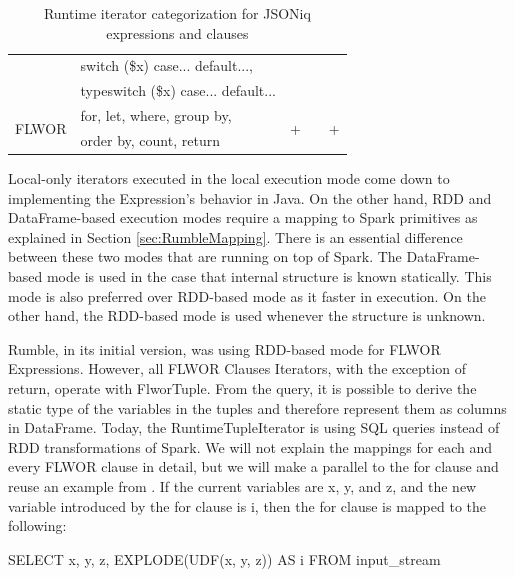 \begin{table}[h!]
{\begin{tabular}{|l|l|l|l|l|}
		\cline{2-2}
		& switch (\$x) case... default...,                           &                    &                    &                     \\ 
		\cline{2-2}
		& typeswitch (\$x) case... default...                        &                    &                    &                     \\ 
		\hline
		\multirow{2}{*}{FLWOR}                 & for, let, where, group by,                                 & \multirow{2}{*}{+} & \multirow{2}{*}{}  & \multirow{2}{*}{+}  \\ 
		\cline{2-2}
		& order by, count, return                                    &                    &                    &                     \\
		\hline
\end{tabular}}
	\caption{Runtime iterator categorization for JSONiq expressions and clauses}
	\label{tab:RuntimeCategoriesMapping}
	\vspace{-3mm}
\end{table}

Local-only iterators executed in the local execution mode come down to implementing the Expression's behavior in Java. On the other hand, RDD and DataFrame-based execution modes require a mapping to Spark primitives as explained in Section \ref{sec:RumbleMapping}. There is an essential difference between these two modes that are running on top of Spark. The DataFrame-based mode is used in the case that internal structure is known statically. This mode is also preferred over RDD-based mode as it faster in execution. On the other hand, the RDD-based mode is used whenever the structure is unknown. 

Rumble, in its initial version, was using RDD-based mode for FLWOR Expressions. However, all FLWOR Clauses Iterators, with the exception of return, operate with FlworTuple. From the query, it is possible to derive the static type of the variables in the tuples and therefore represent them as columns in DataFrame. Today, the RuntimeTupleIterator is using SQL queries instead of RDD transformations of Spark. We will not explain the mappings for each and every FLWOR clause in detail, but we will make a parallel to the for clause and reuse an example from \cite{RumblePaper}. If the current variables are x, y, and z, and the new variable introduced by the for clause is i, then the for clause is mapped to the following:

SELECT x, y, z, EXPLODE(UDF(x, y, z)) AS i FROM input\_stream

